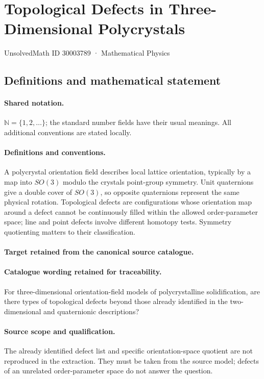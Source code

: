 \documentclass[11pt]{article}
\begin{document}
\setcounter{section}{30003788}
\section{Topological Defects in Three-Dimensional Polycrystals}\label{30003789}
{\small UnsolvedMath ID 30003789 · Mathematical Physics}
\subsection{Definitions and mathematical statement}

\paragraph{Shared notation.}$\mathbb N=\{1,2,\ldots\}$; the standard number fields have their usual meanings. All additional conventions are stated locally.


\paragraph{Definitions and conventions.}
A polycrystal orientation field describes local lattice orientation, typically by a map into $SO(3)$ modulo the crystal\textquotesingle s point-group symmetry. Unit quaternions give a double cover of $SO(3)$, so opposite quaternions represent the same physical rotation. Topological defects are configurations whose orientation map around a defect cannot be continuously filled within the allowed order-parameter space; line and point defects involve different homotopy tests. Symmetry quotienting matters to their classification.

\paragraph{Target retained from the canonical source catalogue.}
\paragraph{Catalogue wording retained for traceability.}
For three-dimensional orientation-field models of polycrystalline solidification, are there types of topological defects beyond those already identified in the two-dimensional and quaternionic descriptions?

\paragraph{Source scope and qualification.}
The already identified defect list and specific orientation-space quotient are not reproduced in the extraction. They must be taken from the source model; defects of an unrelated order-parameter space do not answer the question.
\end{document}
